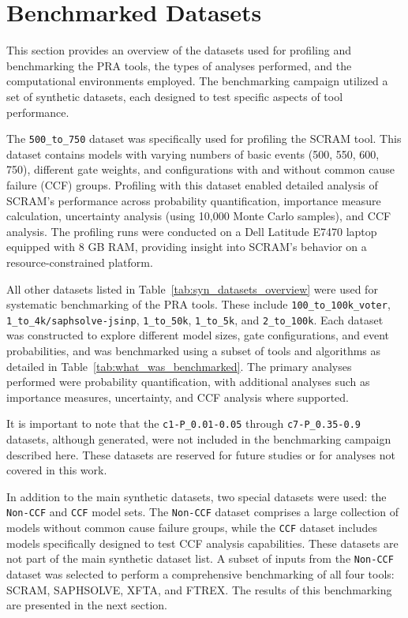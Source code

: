 \section{Benchmarked Datasets}
\label{sec:benchmarked-datasets}


This section provides an overview of the datasets used for profiling and benchmarking the PRA tools, the types of analyses performed, and the computational environments employed. The benchmarking campaign utilized a set of synthetic datasets, each designed to test specific aspects of tool performance.

The \texttt{500\_to\_750} dataset was specifically used for profiling the SCRAM tool. This dataset contains models with varying numbers of basic events (500, 550, 600, 750), different gate weights, and configurations with and without common cause failure (CCF) groups. Profiling with this dataset enabled detailed analysis of SCRAM's performance across probability quantification, importance measure calculation, uncertainty analysis (using 10,000 Monte Carlo samples), and CCF analysis. The profiling runs were conducted on a Dell Latitude E7470 laptop equipped with 8 GB RAM, providing insight into SCRAM's behavior on a resource-constrained platform.

All other datasets listed in Table~\ref{tab:syn_datasets_overview} were used for systematic benchmarking of the PRA tools. These include \texttt{100\_to\_100k\_voter}, \texttt{1\_to\_4k/saphsolve-jsinp}, \texttt{1\_to\_50k}, \texttt{1\_to\_5k}, and \texttt{2\_to\_100k}. Each dataset was constructed to explore different model sizes, gate configurations, and event probabilities, and was benchmarked using a subset of tools and algorithms as detailed in Table~\ref{tab:what_was_benchmarked}. The primary analyses performed were probability quantification, with additional analyses such as importance measures, uncertainty, and CCF analysis where supported.

It is important to note that the \texttt{c1-P\_0.01-0.05} through \texttt{c7-P\_0.35-0.9} datasets, although generated, were not included in the benchmarking campaign described here. These datasets are reserved for future studies or for analyses not covered in this work.

In addition to the main synthetic datasets, two special datasets were used: the \texttt{Non-CCF} and \texttt{CCF} model sets. The \texttt{Non-CCF} dataset comprises a large collection of models without common cause failure groups, while the \texttt{CCF} dataset includes models specifically designed to test CCF analysis capabilities. These datasets are not part of the main synthetic dataset list. A subset of inputs from the \texttt{Non-CCF} dataset was selected to perform a comprehensive benchmarking of all four tools: SCRAM, SAPHSOLVE, XFTA, and FTREX. The results of this benchmarking are presented in the next section.

